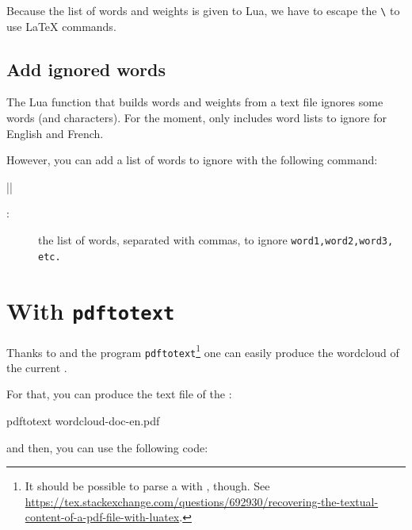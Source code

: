 \documentclass[english]{ltxdoc}
\begin{document}
\begin{remark}
Because the list of words and weights is given to Lua, we have to escape the
\lstinline+\+ to use \LaTeX{} commands. 
\end{remark}

\subsection{Add ignored words}

The Lua function that builds words and weights from a text file ignores some
words (and characters). For the moment,  only includes word
lists to ignore for English and French.

However, you can add a list of words to ignore with the following command:

\commande||\smallskip\index{\wordcloudIgnoreWords@\lstinline+\wordcloudIgnoreWords+}

\begin{description}
  \item[:] the list of words, separated with commas, to ignore
  \lstinline+word1,word2,word3, etc.+
\end{description}

  
\section{With \texttt{pdftotext}}

Thanks to  and the program \texttt{pdftotext}\footnote{It
should be possible to parse a \pdf{} with , though. See \url{https://tex.stackexchange.com/questions/692930/recovering-the-textual-content-of-a-pdf-file-with-luatex}.} one can
easily produce the wordcloud of the current \pdf. 

For that, you can produce the text file of the \pdf{}:
\begin{commandshell}
pdftotext wordcloud-doc-en.pdf
\end{commandshell}
and then, you can use the following code:
\begin{latexcode}
\end{latexcode}  
\end{document}
